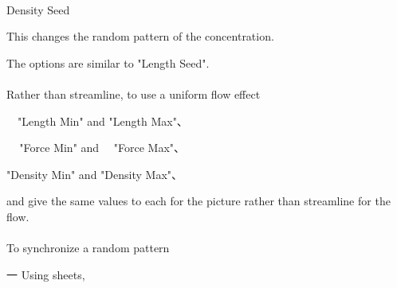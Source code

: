 \documentclass[a4paper,12pt]{article}
\begin{document}
\\
Density Seed\par
This changes the random pattern of the concentration.\par
The options are similar to "Length Seed".\\
\\
Rather than streamline, to use a uniform flow effect\par
\ \ "Length Min" and "Length Max"、\par
\ \,\, "Force Min" and \ \, "Force Max"、\par
"Density Min" and "Density Max"、\par
and give the same values to each for the picture rather than streamline for the flow.\\
\\
To synchronize a random pattern\par
一 Using sheets,

\newpage

\thispagestyle{empty}
\end{document}
